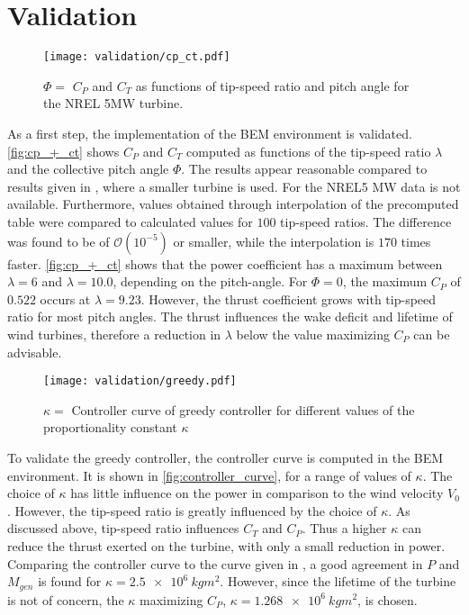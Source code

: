 \section{Validation}
\begin{figure}[h]
	\centering
	\texttt{[image: validation/cp\_ct.pdf]}
	\caption{$\Phi =$ 
		$C_P$ and $C_T$ as functions of tip-speed ratio and pitch angle for the NREL 5MW turbine.}
	\label{fig:cp_+_ct}
\end{figure}
As a first step, the implementation of the BEM environment is validated. \autoref{fig:cp_+_ct} shows $C_P$ and $C_T$ computed as functions of the tip-speed ratio $\lambda$ and the collective pitch angle $\Phi$. The results appear reasonable compared to results given in \cite{hansen_aerodynamics_2008}, where a smaller turbine is used. For the NREL5 MW data is not available. Furthermore, values obtained through interpolation of the precomputed table were compared to calculated values for $100$ tip-speed ratios. The difference was found to be of $\mathcal{O}\left(10^{-5}\right)$ or smaller, while the interpolation is $170$ times faster. \autoref{fig:cp_+_ct} shows that the power coefficient has a maximum between $\lambda=6$ and $\lambda=10.0$, depending on the pitch-angle. For $\Phi=0$, the maximum $C_P$ of $0.522$ occurs at $\lambda=9.23$. However, the thrust coefficient grows with tip-speed ratio for most pitch angles. The thrust influences the wake deficit and lifetime of wind turbines, therefore a reduction in $\lambda$ below the value maximizing $C_P$ can be advisable.\newpage
\begin{figure}[ht]
	\centering
	\texttt{[image: validation/greedy.pdf]}
	\caption{$\kappa =$ Controller curve of greedy controller for different values of the proportionality constant $\kappa$}
	\label{fig:controller_curve}
\end{figure}
To validate the greedy controller, the controller curve is computed in the BEM environment. It is shown in \autoref{fig:controller_curve}, for a range of values of $\kappa$. The choice of $\kappa$ has little influence on the power in comparison to the wind velocity $V_0$. However, the tip-speed ratio is greatly influenced by the choice of $\kappa$. As discussed above, tip-speed ratio influences $C_T$ and $C_P$. Thus a higher $\kappa$ can reduce the thrust exerted on the turbine, with only a small reduction in power. Comparing the controller curve to the curve given in \cite{jonkman_definition_2009}, a good agreement in $P$ and $M_{gen}$ is found for $\kappa=\SI{2.5e6}{kgm^2}$. However, since the lifetime of the turbine is not of concern, the $\kappa$ maximizing $C_P$,  $\kappa = \SI{1.268e6}{kgm^2}$, is chosen. 
